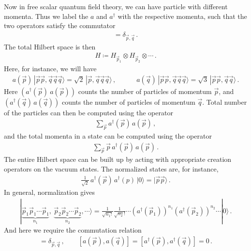 \documentclass[11pt, onesided]{book}
\theoremstyle{break}
\theoremstyle{break}
\begin{document}
Now in free scalar quantum field theory, we can have particle with different momenta. Thus we label the $a$ and $a^\dagger$ with the respective momenta, such that the two operators satisfy the commutator
\begin{align*}
[a(\vec{p}), \, a^\dagger (\vec{q})] = \delta_{\vec{p},\vec{q}}\,.
\end{align*}
The total Hilbert space is then 
\begin{align*}
H \coloneqq H_{\vec{p}_1} \otimes H_{\vec{p}_2} \otimes \cdots \,.
\end{align*}
Here, for instance, we will have
\begin{align*}
a(\vec{p}) \, |\vec{p}\vec{p},\vec{q}\vec{q}\vec{q} \rangle = \sqrt{2}\, |\vec{p},\vec{q}\vec{q}\vec{q}\rangle \,, \quad\qquad
a(\vec{q}) \, |\vec{p}\vec{p},\vec{q}\vec{q}\vec{q} \rangle = \sqrt{3}\, |\vec{p}\vec{p},\vec{q}\vec{q}\rangle \,.
\end{align*}
Here $(a^\dagger(\vec{p})\ a(\vec{p}))$ counts the number of particles of momentum $\vec{p}$, and $(a^\dagger(\vec{q})\, a(\vec{q}))$ counts the number of particles of momentum $\vec{q}$. Total number of the particles can then be computed using the operator
\begin{align*}
\sum_{\vec{p}} a^\dagger(\vec{p}) \, a(\vec{p})\,,
\end{align*}
and the total momenta in a state can be computed using the operator 
\begin{align*}
\sum_{\vec{p}} \vec{p}\, a^\dagger(\vec{p}) \, a(\vec{p})\,.
\end{align*}
The entire Hilbert space can be built up by acting with appropriate creation operators on the vacuum states. The normalized states are, for instance,
\begin{align*}
\frac{1}{\sqrt{2}}\, a^\dagger(\vec{p})\, a^\dagger(p)\, |0\rangle = |\vec{p}\vec{p}\rangle\,.
\end{align*} 
In general, normalization gives
\begin{align*}
|\underbrace{\vec{p}_1\vec{p}_1\cdots \vec{p}_1}_{n_1},\ \underbrace{\vec{p}_2\vec{p}_2\cdots \vec{p}_2}_{n_2}, \cdots \rangle = \frac{1}{\sqrt{n_1 !}} \frac{1}{\sqrt{n_2}!}\cdots \left(a^\dagger (\vec{p}_1) \right)^{n_1}
\left(a^\dagger (\vec{p}_2) \right)^{n_2} \cdots |0\rangle\,.
\end{align*}
And here we require the commutation relation
\begin{align*}
[a(\vec{p}),\, a^\dagger(\vec{q})] = \delta_{\vec{p},\vec{q}}\,, \qquad 
[a(\vec{p}), a(\vec{q})] = [a^\dagger(\vec{p}), a^\dagger(\vec{q})] = 0\,.
\end{align*}
\end{document}
